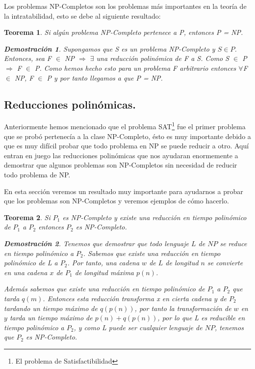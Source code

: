 \documentclass[a4paper,12pt,titlepage]{article}
\newtheorem{teo}{Teorema}[section]
\newtheorem*{dem}{\textbf{Demostraci\'on}}
\begin{document}
Los problemas NP-Completos son los problemas m\'as importantes en la teor\'ia de la intratabilidad, esto se debe al siguiente resultado:

\begin{teo}

Si alg\'un problema NP-Completo pertenece a P, entonces P = NP.

\begin{dem}

Supongamos que S es un problema NP-Completo y $S \in P$. Entonces, sea F $\in$ NP $\Rightarrow$ $\exists$ una reducci\'on polin\'omica de F a S. Como S $\in$ P $\Rightarrow$ F $\in$ P. Como hemos hecho esto para un problema F arbitrario entonces $\forall$F $\in$ NP, F $\in$ P y por tanto llegamos a que P = NP.

\end{dem}

\end{teo}

\subsection{Reducciones polin\'omicas.}

Anteriormente hemos mencionado que el problema SAT\footnote{El problema de Satisfactibilidad} fue el primer problema que se prob\'o pertenec\'ia a la clase NP-Completo, \'esto es muy importante debido a que es muy dif\'icil probar que todo problema en NP se puede reducir a otro. Aqu\'i entran en juego las reducciones polin\'omicas que nos ayudaran enormemente a demostrar que algunos problemas son NP-Completos sin necesidad de reducir todo problema de NP.

En esta secci\'on veremos un resultado muy importante para ayudarnos a probar que los problemas son NP-Completos y veremos ejemplos de c\'omo hacerlo.

\begin{teo}

Si $P_{1}$ es NP-Completo y existe una reducci\'on en tiempo polin\'omico de $P_{1}$ a $P_2$ entonces $P_2$ es NP-Completo.

\begin{dem}

Tenemos que demostrar que todo lenguaje $L$ de $NP$ se reduce en tiempo polin\'omico a $P_2$. Sabemos que existe una reducci\'on en tiempo polin\'omico de L a $P_2$. Por tanto, una cadena $w$ de $L$ de longitud $n$ se convierte en una cadena $x$ de $P_1$ de longitud m\'axima $p(n)$.

Adem\'as sabemos que existe una reducci\'on en tiempo polin\'omico de $P_1$ a $P_2$ que tarda $q(m)$. Entonces esta reducci\'on transforma x en cierta cadena $y$ de $P_2$ tardando un tiempo m\'aximo de $q(p(n))$, por tanto la transformaci\'on de $w$ en $y$ tarda un tiempo m\'aximo de $p(n) + q(p(n))$, por lo que L es reducible en tiempo polin\'omico a $P_2$, y como L puede ser cualquier lenguaje de $NP$, tenemos que $P_2$ es NP-Completo.

\end{dem}

\end{teo}
\end{document}
